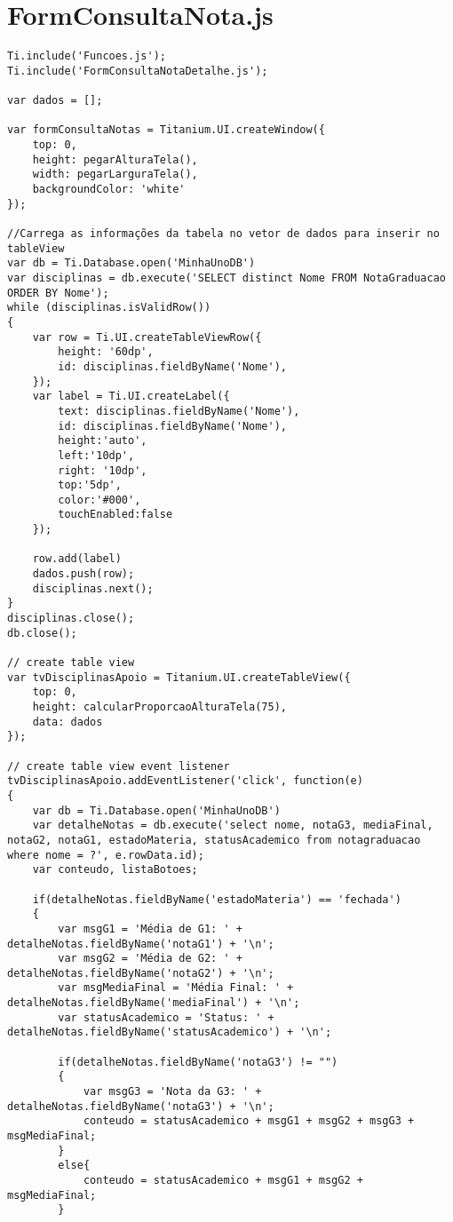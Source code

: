 \section{FormConsultaNota.js}
\begin{lstlisting}
Ti.include('Funcoes.js');
Ti.include('FormConsultaNotaDetalhe.js');

var dados = [];

var formConsultaNotas = Titanium.UI.createWindow({
	top: 0,
	height: pegarAlturaTela(),
	width: pegarLarguraTela(),
	backgroundColor: 'white'
});

//Carrega as informações da tabela no vetor de dados para inserir no tableView
var db = Ti.Database.open('MinhaUnoDB')
var disciplinas = db.execute('SELECT distinct Nome FROM NotaGraduacao ORDER BY Nome');
while (disciplinas.isValidRow())
{
	var row = Ti.UI.createTableViewRow({
		height: '60dp',
		id: disciplinas.fieldByName('Nome'),
	});
	var label = Ti.UI.createLabel({
		text: disciplinas.fieldByName('Nome'),
		id: disciplinas.fieldByName('Nome'),
		height:'auto',
		left:'10dp',
		right: '10dp',
		top:'5dp',
		color:'#000',
		touchEnabled:false
	});
	
	row.add(label)
	dados.push(row);
	disciplinas.next();
}
disciplinas.close();
db.close();

// create table view
var tvDisciplinasApoio = Titanium.UI.createTableView({
	top: 0,
	height: calcularProporcaoAlturaTela(75),
	data: dados
});
 
// create table view event listener
tvDisciplinasApoio.addEventListener('click', function(e)
{
	var db = Ti.Database.open('MinhaUnoDB')
	var detalheNotas = db.execute('select nome, notaG3, mediaFinal, notaG2, notaG1, estadoMateria, statusAcademico from notagraduacao where nome = ?', e.rowData.id);
	var conteudo, listaBotoes;
	
	if(detalheNotas.fieldByName('estadoMateria') == 'fechada')
	{
		var msgG1 = 'Média de G1: ' + detalheNotas.fieldByName('notaG1') + '\n';
		var msgG2 = 'Média de G2: ' + detalheNotas.fieldByName('notaG2') + '\n';
		var msgMediaFinal = 'Média Final: ' + detalheNotas.fieldByName('mediaFinal') + '\n';
		var statusAcademico = 'Status: ' + detalheNotas.fieldByName('statusAcademico') + '\n';
		
		if(detalheNotas.fieldByName('notaG3') != "")
		{
			var msgG3 = 'Nota da G3: ' + detalheNotas.fieldByName('notaG3') + '\n';
			conteudo = statusAcademico + msgG1 + msgG2 + msgG3 + msgMediaFinal;
		}
		else{
			conteudo = statusAcademico + msgG1 + msgG2 + msgMediaFinal;
		}
		

\end{lstlisting}
